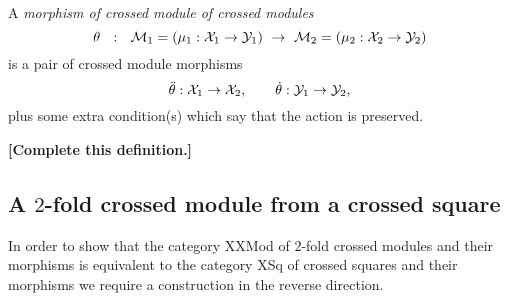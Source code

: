 \medskip
\begin{defn} 
A \emph{morphism of crossed module of crossed modules}
$$
\theta ~~:~~ \mathcal{M}_1 = (\mu_1 : \mathcal{X}_1 \to \mathcal{Y}_1) 
       ~\to~ \mathcal{M}_2 = (\mu_2 : \mathcal{X}_2 \to \mathcal{Y}_2)
$$
is a pair of crossed module morphisms
$$
\ddot{\theta} : \mathcal{X}_1 \to \mathcal{X}_2, \qquad 
 \dot{\theta} : \mathcal{Y}_1 \to \mathcal{Y}_2,
$$
plus some extra condition(s) which say that the action is preserved.

\noindent
{\bf [Complete this definition.]}
\end{defn}

\bigskip
\subsection{A $2$-fold crossed module from a crossed square}

In order to show that the category {\sf XXMod} of $2$-fold 
crossed modules and their morphisms is equivalent to the
category {\sf XSq} of crossed squares and their morphisms 
we require a construction in the reverse direction.

